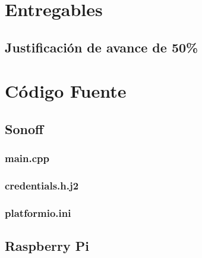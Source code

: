 \chapter{Entregables}


\section{Justificación de avance de 50\%}







\chapter{Código Fuente} \label{anexo-codigo-fuente}



\section{Sonoff} \label{anexo-sonoff}



\subsection{main.cpp} \label{anexo-esp-main}



\subsection{credentials.h.j2} \label{anexo-credentials}



\subsection{platformio.ini}







\section{Raspberry Pi} \label{anexo-rpi}



